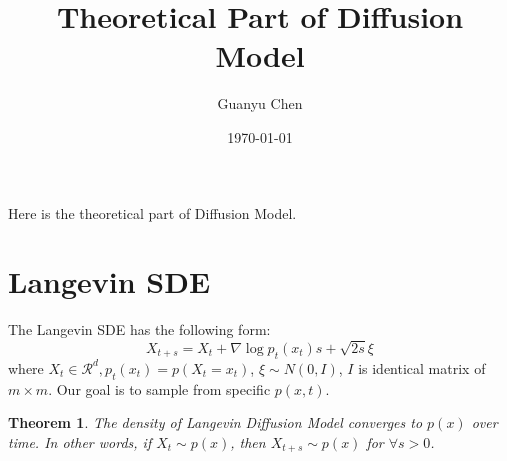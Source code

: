 \documentclass{article}
\title{Theoretical Part of Diffusion Model}
\author{Guanyu Chen}
\date{\today}
\newtheorem{theorem}{Theorem}
\begin{document}
\maketitle
\tableofcontents
\newpage
Here is the theoretical part of Diffusion Model. 
\section{Langevin SDE}
The Langevin SDE has the following form:
\begin{equation}
    X_{t + s} = X_t + \nabla \log p_t(x_t)s + \sqrt{2s}\xi
\end{equation}
where $X_t\in \mathcal{R}^d, p_t(x_t)=p(X_t=x_t)$, $\xi\sim N(0, I)$, $I$ is identical matrix of $m \times m$. Our goal is to sample from specific $p(x, t)$.

\begin{theorem}
    The density of Langevin Diffusion Model converges to $p(x)$ over time. In other words, if $X_t\sim p(x)$, then $X_{t+s}\sim p(x)$ for $\forall s>0$. 
\end{theorem}
\end{document}
